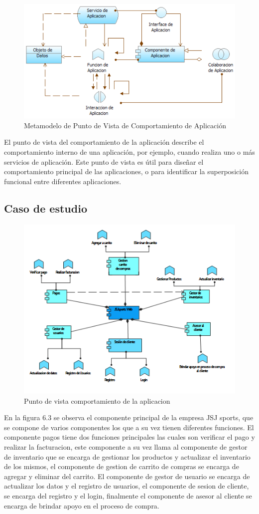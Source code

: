 \begin{figure}[th!]
	\centering
	\includegraphics[width=0.6\linewidth]{arquitectura/imagenes/modeloComportamientoAplicacion}
	\caption{Metamodelo de Punto de Vista de Comportamiento de Aplicación \cite{pun7}}
	\label{fig:metamodelo de punto de vista de comportamiento de aplicación}
\end{figure}
El punto de vista del comportamiento de la aplicación describe el comportamiento interno de una aplicación, por ejemplo, cuando realiza uno o más servicios de aplicación. Este punto de vista es útil para diseñar el comportamiento principal de las aplicaciones, o para identificar la superposición funcional entre diferentes aplicaciones.

\subsection{Caso de estudio}
\begin{figure}[th!]
	\centering
	\includegraphics[width=0.6\linewidth]{arquitectura/imagenes/VistaComportamientoAplicacion}
	\caption{Punto de vista comportamiento de la aplicacion}
	\label{fig:vistacomportamientoaplicacion}
\end{figure}
En la figura 6.3 se observa el componente principal de la empresa JSJ sports, que se compone de varios componentes los que a su vez tienen diferentes funciones.
\newline
El componente pagos tiene dos funciones principales las cuales son verificar el pago y	realizar la facturacion, este componente a su vez llama al componente de gestor de inventario que se encarga de gestionar los productos y actualizar el inventario de los mismos, el componente de gestion de carrito de compras se encarga de agregar y eliminar del carrito.
El componente de gestor de usuario se encarga de actualizar los datos y el registro de usuarios, el componente de sesion de cliente, se encarga del registro y el login, finalmente el componente de asesor al cliente se encarga de brindar apoyo en el proceso de compra.
\newpage

